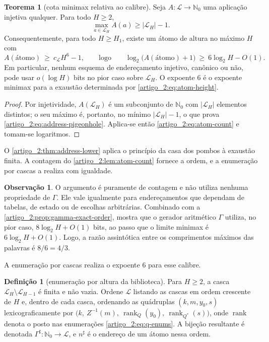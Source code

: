 \documentclass[12pt,a4paper]{article}
\theoremstyle{preciso}
\theoremstyle{definition}
\newcommand{\rank}{\operatorname{rank}}
\newcommand{\Nzero}{\mathbb{N}_0}
\newcommand{\Library}{\mathcal{L}}
\theoremstyle{preciso}
\newtheorem{theorem}[teorema]{Teorema}
\theoremstyle{preciso}
\theoremstyle{preciso}
\theoremstyle{preciso}
\theoremstyle{definition}
\newtheorem{definition}[teorema]{Definição}
\theoremstyle{preciso}
\theoremstyle{definition}
\newtheorem{remark}[teorema]{Observação}
\theoremstyle{preciso}
\theoremstyle{preciso}
\theoremstyle{definition}
\begin{document}
\begin{theorem}[cota minimax relativa ao calibre]\label{map:artigo_2:3.4}\label{artigo_2:thm:address-lower}
Seja $A:\Library\to\Nzero$ uma aplicação injetiva qualquer. Para todo $H\ge2$,
\begin{equation}
 \max_{a\in\Library_H}A(a)\ge |\Library_H|-1.
 \label{artigo_2:eq:address-pigeonhole}
\end{equation}
Consequentemente, para todo $H\ge H_1$, existe um átomo de altura no máximo
$H$ com
\begin{equation}
 A(\text{átomo})\ \ge\ c_\Library H^6-1,
 \qquad\text{logo}\qquad
 \log_2\bigl(A(\text{átomo})+1\bigr)\ \ge\ 6\log_2H-O(1).
 \label{artigo_2:eq:address-lower}
\end{equation}
Em particular, nenhum esquema de endereçamento injetivo, canônico ou não,
pode usar $o(\log H)$ bits no pior caso sobre $\Library_H$. O expoente $6$ é
o expoente minimax para a exaustão determinada por \eqref{artigo_2:eq:atom-height}.
\end{theorem}

\begin{proof}
Por injetividade, $A(\Library_H)$ é um subconjunto de $\Nzero$ com
$|\Library_H|$ elementos distintos; o seu máximo é, portanto, no mínimo
$|\Library_H|-1$, o que prova \eqref{artigo_2:eq:address-pigeonhole}. Aplica-se então
\eqref{artigo_2:eq:atom-count} e tomam-se logaritmos.
\end{proof}

O \cref{artigo_2:thm:address-lower} aplica o princípio da casa dos pombos à exaustão finita. A contagem do \cref{artigo_2:lem:atom-count} fornece a ordem, e a enumeração por cascas a realiza com igualdade.

\begin{remark}\label{map:artigo_2:3.5}
O argumento é puramente de contagem e não utiliza nenhuma propriedade de $\Gamma$. Ele vale igualmente para endereçamentos que dependam de tabelas, de estado ou de escolhas arbitrárias. Combinado com a \cref{artigo_2:prop:gamma-exact-order}, mostra que o gerador aritmético $\Gamma$ utiliza, no pior caso, $8\log_2H+O(1)$ bits, ao passo que o limite minimax é $6\log_2H+O(1)$. Logo, a razão assintótica entre os comprimentos máximos das palavras é $8/6=4/3$.
\end{remark}

A enumeração por cascas realiza o expoente $6$ para esse calibre.

\begin{definition}[enumeração por altura da biblioteca]\label{map:artigo_2:3.6}\label{artigo_2:def:sharp}
Para $H\ge2$, a casca $\Library_H\setminus\Library_{H-1}$ é finita e não vazia. Ordene $\Library$ listando as cascas em ordem crescente de $H$ e, dentro de cada casca, ordenando as quádruplas $(k,m,y_0,s)$ lexicograficamente por $\bigl(k,\ Z^{-1}(m),\ \rank_Q(y_0),\ \rank_{Q^*}(s)\bigr)$, onde $\rank$ denota o posto nas enumerações \eqref{artigo_2:eq:q-enums}. A bijeção resultante é denotada $\Gamma^\sharp:\Nzero\to\Library$, e $n^\sharp$ é o endereço de um átomo nessa ordem.
\end{definition}
\end{document}
